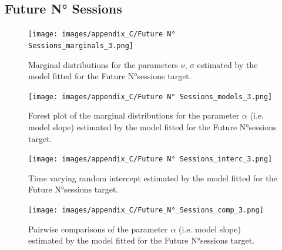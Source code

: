 \subsection{Future N° Sessions}
\label{future_no_sess_bayes_3}

\begin{figure}[H]
\centering
\texttt{[image: images/appendix\_C/Future N° Sessions\_marginals\_3.png]}
\caption[\textbf{Future N°sessions marginal distributions}]{Marginal distributions for the parameters $\nu$, $\sigma$ estimated by the model fitted for the Future N°sessions target.}
\label{marginals_no_sess_3}
\end{figure}

\begin{figure}[H]
\centering
\texttt{[image: images/appendix\_C/Future N° Sessions\_models\_3.png]}
\caption[\textbf{Future N°sessions model fixed effect}]{Forest plot of the marginal distributions for the parameter $\alpha$ (i.e. model slope) estimated by the model fitted for the Future N°sessions target.}
\label{model_no_sess_3}
\end{figure}

\begin{figure}[H]
\centering
\texttt{[image: images/appendix\_C/Future N° Sessions\_interc\_3.png]}
\caption[\textbf{Future N°sessions time-varying random intercept}]{Time varying random intercept estimated by the model fitted for the Future N°sessions target.}
\label{interc_no_sess_3}
\end{figure}

\begin{figure}[H]
\centering
\texttt{[image: images/appendix\_C/Future\_N°\_Sessions\_comp\_3.png]}
\caption[\textbf{Future N°sessions pairwise comparisons of model fixed effect}]{Pairwise comparisons of the parameter $\alpha$ (i.e. model slope) estimated by the model fitted for the Future N°sessions target.}
\label{comp_no_sess_3}
\end{figure}
